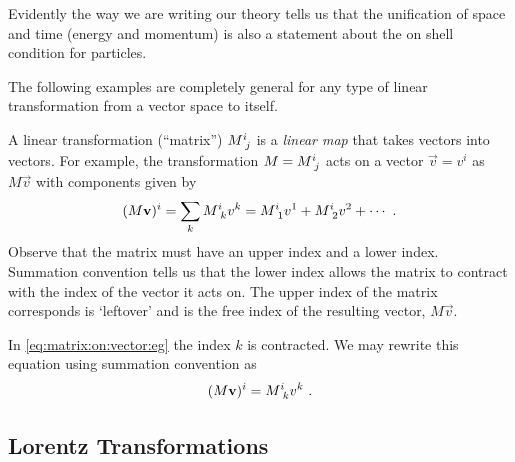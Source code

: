\documentclass[12pt, oneside]{report}    %
\begin{document}
Evidently the way we are writing our theory tells us that the unification of space and time (energy and momentum) is also a statement about the on shell condition for particles. 


The following examples are completely general for any type of linear transformation from a vector space to itself. 
\begin{example}
A linear transformation (``matrix'') $M\aij{i}{j}$ is a \emph{linear map} that takes vectors into vectors. For example, the transformation $M=M\aij{i}{j}$ acts on a vector $\vec{v} = v^i$ as $M\vec{v}$ with components given by
\begin{align}
    (M\vec{v})^i = \sum_k M\aij{i}{k}v^k = M\aij{i}{1}v^1 + M\aij{i}{2}v^2 + \cdots \ .
    \label{eq:matrix:on:vector:eg}
\end{align}
Observe that the matrix must have an upper index and a lower index. Summation convention tells us that the lower index allows the matrix to contract with the  index of the vector it acts on. The upper index of the matrix corresponds is `leftover' and is the free index of the resulting vector, $M\vec{v}$.
\end{example}


\begin{example}
In \eqref{eq:matrix:on:vector:eg} the index $k$ is contracted. We may rewrite this equation using summation convention as
\begin{align}
    (M\vec{v})^i = M\aij{i}{k}v^k \ .
\end{align}
\end{example}




\subsection{Lorentz Transformations}
\end{document}
